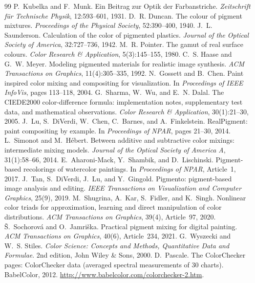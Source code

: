 \documentclass[11pt,a4paper]{article}
\begin{document}








\begin{thebibliography}{99}
 P.~Kubelka and F.~Munk. Ein Beitrag zur Optik der Farbanstriche. \emph{Zeitschrift f\"ur Technische Physik}, 12:593--601, 1931.
 D.~R. Duncan. The colour of pigment mixtures. \emph{Proceedings of the Physical Society}, 52:390--400, 1940.
 J.~L. Saunderson. Calculation of the color of pigmented plastics. \emph{Journal of the Optical Society of America}, 32:727--736, 1942.
 M.~R. Pointer. The gamut of real surface colours. \emph{Color Research \& Application}, 5(3):145--155, 1980.
 C.~S. Haase and G.~W. Meyer. Modeling pigmented materials for realistic image synthesis. \emph{ACM Transactions on Graphics}, 11(4):305--335, 1992.
 N.~Gossett and B.~Chen. Paint inspired color mixing and compositing for visualization. In \emph{Proceedings of IEEE InfoVis}, pages 113--118, 2004.
 G.~Sharma, W.~Wu, and E.~N. Dalal. The CIEDE2000 color-difference formula: implementation notes, supplementary test data, and mathematical observations. \emph{Color Research \& Application}, 30(1):21--30, 2005.
 J.~Lu, S.~DiVerdi, W.~Chen, C.~Barnes, and A.~Finkelstein. RealPigment: paint compositing by example. In \emph{Proceedings of NPAR}, pages 21--30, 2014.
 L.~Simonot and M.~H\'ebert. Between additive and subtractive color mixings: intermediate mixing models. \emph{Journal of the Optical Society of America A}, 31(1):58--66, 2014.
 E.~Aharoni-Mack, Y.~Shambik, and D.~Lischinski. Pigment-based recolorings of watercolor paintings. In \emph{Proceedings of NPAR}, Article~1, 2017.
 J.~Tan, S.~DiVerdi, J.~Lu, and Y.~Gingold. Pigmento: pigment-based image analysis and editing. \emph{IEEE Transactions on Visualization and Computer Graphics}, 25(9), 2019.
 M.~Shugrina, A.~Kar, S.~Fidler, and K.~Singh. Nonlinear color triads for approximation, learning and direct manipulation of color distributions. \emph{ACM Transactions on Graphics}, 39(4), Article~97, 2020.
 \v{S}.~Sochorov\'a and O.~Jamri\v{s}ka. Practical pigment mixing for digital painting. \emph{ACM Transactions on Graphics}, 40(6), Article~234, 2021.
 G.~Wyszecki and W.~S. Stiles. \emph{Color Science: Concepts and Methods, Quantitative Data and Formulae}. 2nd edition, John Wiley \& Sons, 2000.
 D.~Pascale. The ColorChecker pages: ColorChecker data (averaged spectral measurements of 30 charts). BabelColor, 2012. \url{http://www.babelcolor.com/colorchecker-2.htm}.
\end{thebibliography}


\end{document}
